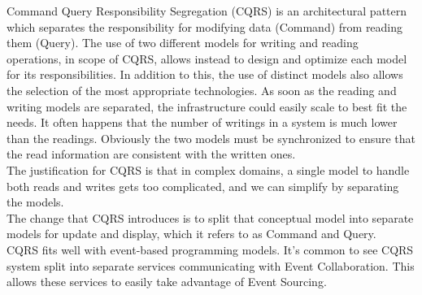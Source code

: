 \newpage
{}
Command Query Responsibility Segregation (CQRS) is an architectural pattern which separates the responsibility for modifying data (Command) from reading them (Query). The use of two different models for writing and reading operations, in scope of CQRS, allows instead to design and optimize each model for its responsibilities. In addition to this, the use of distinct models also allows the selection of the most appropriate technologies. As soon as the reading and writing models are separated, the infrastructure could easily scale to best fit the needs. It often happens that the number of writings in a system is much lower than the readings. Obviously the two models must be synchronized to ensure that the read information are consistent with the written ones.\\
The justification for CQRS is that in complex domains, a single model to handle both reads and writes gets too complicated, and we can simplify by separating the models.\\
The change that CQRS introduces is to split that conceptual model into separate models for update and display, which it refers to as Command and Query.\\
CQRS fits well with event-based programming models. It's common to see CQRS system split into separate services communicating with Event Collaboration. This allows these services to easily take advantage of Event Sourcing.


